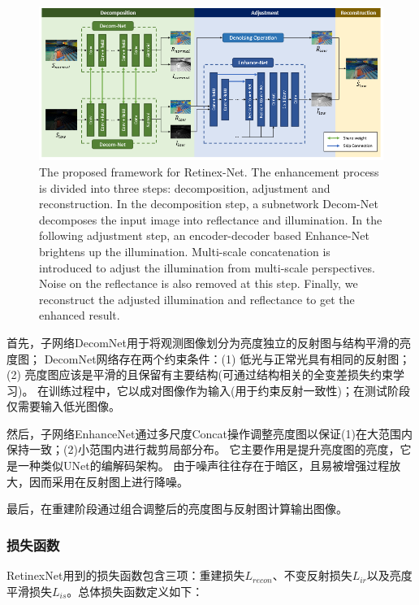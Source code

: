 \documentclass[letterpaper,12pt]{article}
\begin{document}
	\begin{figure}[ht] 
		\centering \includegraphics[width=0.8\columnwidth]{RetinexNet}
		\caption{
			\label{fig:RetinexNet} %
			The proposed framework for Retinex-Net. The enhancement process is divided into three steps: decomposition, adjustment and reconstruction. In the decomposition step, a subnetwork Decom-Net decomposes the input image into reflectance and illumination. In the following adjustment step, an encoder-decoder based Enhance-Net brightens up the illumination. Multi-scale concatenation is introduced to adjust the illumination from multi-scale perspectives. Noise on the reflectance is also removed at this step. Finally, we reconstruct the adjusted illumination and reflectance to get the enhanced result.
		}
	\end{figure}
	
	首先，子网络DecomNet用于将观测图像划分为亮度独立的反射图与结构平滑的亮度图；
	DecomNet网络存在两个约束条件：(1) 低光与正常光具有相同的反射图；(2) 亮度图应该是平滑的且保留有主要结构(可通过结构相关的全变差损失约束学习)。
	在训练过程中，它以成对图像作为输入(用于约束反射一致性)；在测试阶段仅需要输入低光图像。
	
	然后，子网络EnhanceNet通过多尺度Concat操作调整亮度图以保证(1)在大范围内保持一致；(2)小范围内进行裁剪局部分布。
	它主要作用是提升亮度图的亮度，它是一种类似UNet的编解码架构。
	由于噪声往往存在于暗区，且易被增强过程放大，因而采用在反射图上进行降噪。
	
	最后，在重建阶段通过组合调整后的亮度图与反射图计算输出图像。
	
	\subsubsection{损失函数}
	
	RetinexNet用到的损失函数包含三项：重建损失$L_{recon}$、不变反射损失$L_{ir}$以及亮度平滑损失$L_{is}$。总体损失函数定义如下：
	
\end{document}

